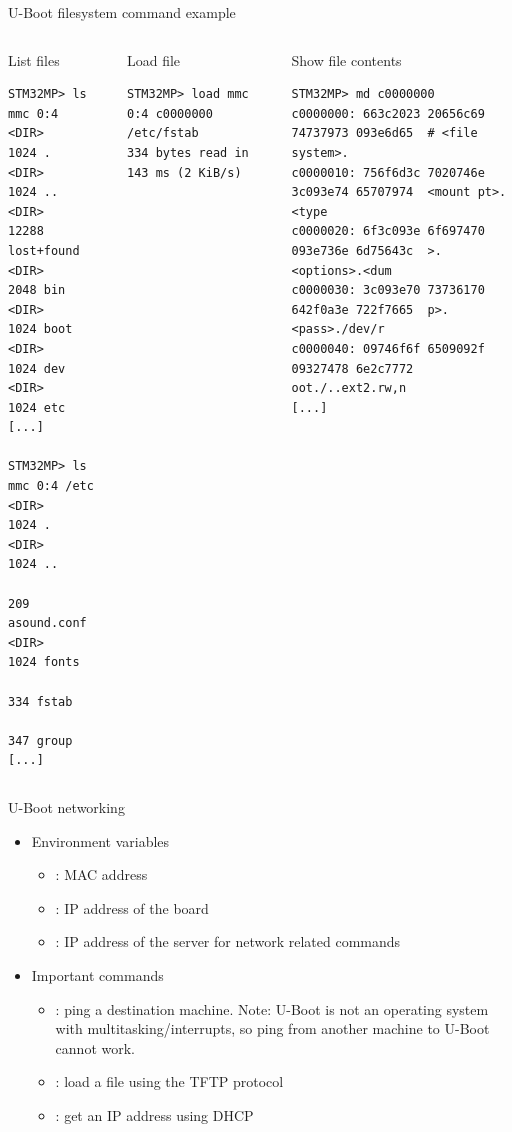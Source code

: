 \begin{frame}[fragile]{U-Boot filesystem command example}
  \begin{columns}
    \begin{block}{List files}
      {\tiny
\begin{verbatim}
STM32MP> ls mmc 0:4
<DIR>       1024 .
<DIR>       1024 ..
<DIR>      12288 lost+found
<DIR>       2048 bin
<DIR>       1024 boot
<DIR>       1024 dev
<DIR>       1024 etc
[...]

STM32MP> ls mmc 0:4 /etc
<DIR>       1024 .
<DIR>       1024 ..
             209 asound.conf
<DIR>       1024 fonts
             334 fstab
             347 group
[...]
\end{verbatim}
      }
    \end{block}

    \begin{block}{Load file}
      {\tiny
\begin{verbatim}
STM32MP> load mmc 0:4 c0000000 /etc/fstab
334 bytes read in 143 ms (2 KiB/s)
\end{verbatim}
      }
    \end{block}

    \begin{block}{Show file contents}
      {\tiny
\begin{verbatim}
STM32MP> md c0000000
c0000000: 663c2023 20656c69 74737973 093e6d65  # <file system>.
c0000010: 756f6d3c 7020746e 3c093e74 65707974  <mount pt>.<type
c0000020: 6f3c093e 6f697470 093e736e 6d75643c  >.<options>.<dum
c0000030: 3c093e70 73736170 642f0a3e 722f7665  p>.<pass>./dev/r
c0000040: 09746f6f 6509092f 09327478 6e2c7772  oot./..ext2.rw,n
[...]
\end{verbatim}
      }
    \end{block}
  \end{columns}
\end{frame}

\begin{frame}{U-Boot networking}
  \begin{itemize}
  \item Environment variables
    \begin{itemize}
    \item {}: MAC address
    \item {}: IP address of the board
    \item {}: IP address of the server for network related commands
    \end{itemize}
  \item Important commands
    \begin{itemize}
    \item {}: ping a destination machine. Note: U-Boot is not
      an operating system with multitasking/interrupts, so ping from
      another machine to U-Boot cannot work.
    \item {}: load a file using the TFTP protocol
    \item {}: get an IP address using DHCP
    \end{itemize}
  \end{itemize}
\end{frame}

